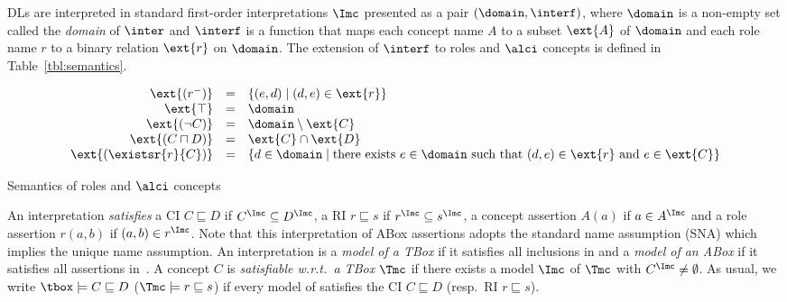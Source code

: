 \documentclass{lmcs}
\theoremstyle{definition}
\begin{document}
DLs are interpreted in standard first-order interpretations $\Imc$ presented as a pair $(\domain,\interf)$, where 
$\domain$ is a non-empty set called the \emph{domain} of $\inter$ and 
$\interf$ is a function that maps each concept name $A$ to a subset 
$\ext{A}$ of $\domain$ and each role name $r$ to a binary relation 
$\ext{r}$ on $\domain$. The extension of $\interf$ to roles and $\alci$ 
concepts is defined in Table~\ref{tbl:semantics}.
%
\begin{table}
  \[\begin{array}{rcl}
    \ext{(r^-)}            & = & \{(e,d)\mid (d,e)\in\ext{r}\} \\%
    \ext{\top}             & = & \domain\\
    \ext{(\neg C)}         & = & \domain\setminus \ext{C}\\
    \ext{(C \sqcap D)}     & = & \ext{C}\cap \ext{D}\\
    \ext{(\existsr{r}{C})} & = & \{d\in\domain\mid \text{there exists }e\in\domain \text{ such that } (d,e)\in \ext{r} \text{ and } e \in \ext{C}\}\\    
  \end{array}\]
  \caption{Semantics of roles and $\alci$ concepts}\label{tbl:semantics}
\end{table}
%
An interpretation \Imc \emph{satisfies} a CI $C \sqsubseteq D$ if
$C^\Imc \subseteq D^\Imc$, a RI $r \sqsubseteq s$ if
$r^\Imc \subseteq s^\Imc$, a concept assertion $A(a)$ if
$a \in A^\Imc$ and a role assertion $r(a,b)$ if $(a,b) \in
r^\Imc$.
Note that this interpretation of ABox assertions adopts the standard
name assumption (SNA) which implies the unique name assumption. 
%
An interpretation is a \emph{model of a TBox} \Tmc if it satisfies all 
inclusions in \Tmc and a \emph{model of an ABox} \Amc if it satisfies 
all assertions in~\Amc. A concept $C$ is \emph{satisfiable w.r.t.~a 
TBox $\Tmc$} if there exists a model $\Imc$ of $\Tmc$ with 
$C^{\Imc}\not=\emptyset$. As usual, we write $\tbox\models C 
\sqsubseteq D$ ($\Tmc \models r \sqsubseteq s$) if every model of \Tmc 
satisfies the CI $C\sqsubseteq D$ (resp.\ RI $r \sqsubseteq s$). 
\end{document}
